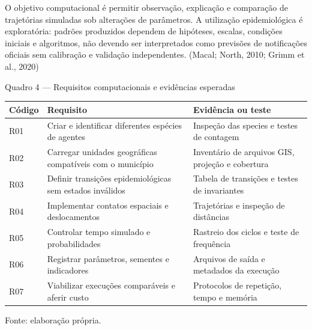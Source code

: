 O objetivo computacional é permitir observação, explicação e comparação
de trajetórias simuladas sob alterações de parâmetros. A utilização
epidemiológica é exploratória: padrões produzidos dependem de hipóteses,
escalas, condições iniciais e algoritmos, não devendo ser interpretados
como previsões de notificações oficiais sem calibração e validação
independentes. (Macal; North, 2010; Grimm et al., 2020)

Quadro 4 --- Requisitos computacionais e evidências esperadas

\begin{longtable}[]{@{}
  >{\raggedright\arraybackslash}p{}
  >{\raggedright\arraybackslash}p{}
  >{\raggedright\arraybackslash}p{}@{}}
\toprule\noalign{}
\begin{minipage}[b]{\linewidth}\raggedright
\textbf{Código}
\end{minipage} & \begin{minipage}[b]{\linewidth}\raggedright
\textbf{Requisito}
\end{minipage} & \begin{minipage}[b]{\linewidth}\raggedright
\textbf{Evidência ou teste}
\end{minipage} \\
\midrule\noalign{}
\endhead
\bottomrule\noalign{}
\endlastfoot
R01 & Criar e identificar diferentes espécies de agentes & Inspeção das
species e testes de contagem \\
R02 & Carregar unidades geográficas compatíveis com o município &
Inventário de arquivos GIS, projeção e cobertura \\
R03 & Definir transições epidemiológicas sem estados inválidos & Tabela
de transições e testes de invariantes \\
R04 & Implementar contatos espaciais e deslocamentos & Trajetórias e
inspeção de distâncias \\
R05 & Controlar tempo simulado e probabilidades & Rastreio dos ciclos e
teste de frequência \\
R06 & Registrar parâmetros, sementes e indicadores & Arquivos de saída e
metadados da execução \\
R07 & Viabilizar execuções comparáveis e aferir custo & Protocolos de
repetição, tempo e memória \\
\end{longtable}

Fonte: elaboração própria.

